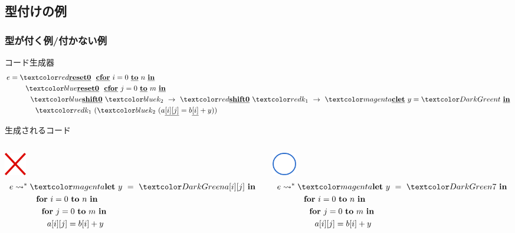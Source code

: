 \subsection{型付けの例}

\begin{frame}
  \frametitle{型が付く例/付かない例}
  コード生成器
  \begin{align*}
    e & = \red{\cResetz} ~~\cforin{i = 0}{n} \\
      & \phantom{=}~~~~\blue{\cResetz} ~~\cforin{j = 0}{m} \\
      & \phantom{=}~~~~~~ \blue{\cShiftz}~\blue{k_2}~\to~ \red{\cShiftz}~\red{k_1}~\to~ \magenta{\cLet~y=\green{t}~\cIn} \\
      & \phantom{=}~~~~~~~~ \red{k_1}~(\blue{k_2}~(a\cArrays{i}{j} = b\cArray{i} + y))
  \end{align*}

  \pause
  生成されるコード
  \begin{columns}
    \begin{column}{0.5\textwidth}%
      \center
      \includegraphics[clip,height=1cm]{./img/batsu.png}
      \begin{align*}
        e & \too \magenta{\Let ~y ~= ~\green{a[i][j]} ~\In} \\
          & \phantom{\too}~~~~ \forin{i = 0}{n} \\
          & \phantom{\too}~~~~~~\forin{j = 0}{m} \\
          & \phantom{\too}~~~~~~~~a[i][j] = b[i] + y \\
      \end{align*}
    \end{column}

    \begin{column}{0.5\textwidth}%
      \center
      \includegraphics[height=1cm]{./img/maru.png}
      \begin{align*}
        e & \too \magenta{\Let ~y ~= ~\green{7} ~\In} \\
          & \phantom{\too}~~~~ \forin{i = 0}{n} \\
          & \phantom{\too}~~~~~~\forin{j = 0}{m} \\
          & \phantom{\too}~~~~~~~~a[i][j] = b[i] + y \\
      \end{align*}
    \end{column}
  \end{columns}
\end{frame}

